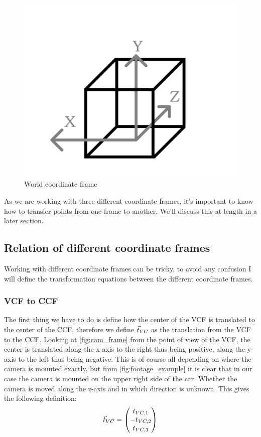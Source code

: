 \begin{figure}
    \centering
    \includegraphics[width=1\textwidth]{figures/world_frame.png}
    \caption{World coordinate frame}
    \label{fig:world_frame}
\end{figure}

As we are working with three different coordinate frames, it's important to know how to transfer points from one frame to another. We'll discuss this at length in a later section.

\subsection{Relation of different coordinate frames}
Working with different coordinate frames can be tricky, to avoid any confusion I will define the transformation equations between the different coordinate frames. 

\subsubsection{VCF to CCF}
The first thing we have to do is define how the center of the VCF is translated to the center of the CCF, therefore we define $\vec t_{VC}$ as the translation from the VCF to the CCF. Looking at \autoref{fig:cam_frame} from the point of view of the VCF, the center is translated along the x-axis to the right thus being positive, along the y-axis to the left thus being negative. This is of course all depending on where the camera is mounted exactly, but from \autoref{fig:footage_example} it is clear that in our case the camera is mounted on the upper right side of the car. Whether the camera is moved along the z-axis and in which direction is unknown. This gives the following definition:
\begin{equation}
    \vec t_{VC} = \begin{pmatrix}
         t_{VC,1} \\ -t_{VC,2} \\ t_{VC,3}
     \end{pmatrix} 
\end{equation}

